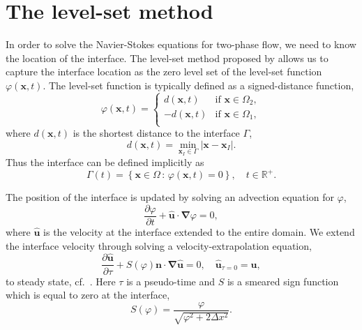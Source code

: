 \documentclass[11pt,b5paper,DIV=calc,BCOR1.3cm,headings=small,%
               footinclude=false,headsepline]{scrbook}
\newcommand*{\pdt}[1]{\ensuremath{\frac{\partial #1}{\partial t}}}
\newcommand*{\pd}[2]{\ensuremath{\frac{\partial #1}{\partial{#2}}}}
\newcommand*{\vct}[1]{\ensuremath{\boldsymbol{#1}}}
\newcommand*{\del}{\boldsymbol\nabla}
\newcommand*{\grad}{\del}
\newcommand{\set}[2]{\ensuremath{\left\{#1\,:\,#2\right\}}}
\begin{document}
\section{The level-set method}
\label{sec:level-set}
In order to solve the Navier-Stokes equations for two-phase flow, we need to
know the location of the interface.  The level-set method proposed by
\citet{Osher88} allows us to capture the interface location as the zero level
set of the level-set function $\varphi(\vct x,t)$.  The level-set function is
typically defined as a signed-distance function,
\begin{equation}
  \varphi(\vct x,t) = \begin{cases}
     d(\vct x,t) & \text{if } \vct x\in\Omega_2, \\
    -d(\vct x,t) & \text{if } \vct x\in\Omega_1, \\
  \end{cases}
\end{equation}
where $d(\vct x,t)$ is the shortest distance to the interface $\Gamma$,
\begin{equation}
  d(\vct x,t) = \min_{\vct x_I \in \Gamma} |\vct x - \vct x_I|.
\end{equation}
Thus the interface can be defined implicitly as
\begin{equation}
  \Gamma(t) = \set{\vct x\in\Omega}{\varphi(\vct x,t)=0},
              \quad t\in \mathbb R^+.
\end{equation}

The position of the interface is updated by solving an advection equation for
$\varphi$,
\begin{equation}
  \label{eq:ls_adeq}
  \pdt{\varphi} + \vct{\hat u}\cdot\grad\varphi = 0,
\end{equation}
where $\vct{\hat u}$ is the velocity at the interface extended to the entire
domain.  We extend the interface velocity through solving
a velocity-extrapolation equation,
\begin{equation}
  \label{eq:ls_velextr}
  \pd{\vct{\hat u}}{\tau} + S(\varphi)\vct n\cdot\grad\vct{\hat u} = 0,
  \quad \vct{\hat u}_{\tau=0} = \vct u,
\end{equation}
to steady state, cf.\ \cite{Adalsteinsson99,Zhao96}.  Here $\tau$ is
a pseudo-time and $S$ is a smeared sign function which is equal to zero at the
interface,
\begin{equation}
  S(\varphi) = \frac{\varphi}{\sqrt{\varphi^2+2\Delta x^2}}.
\end{equation}
\end{document}
